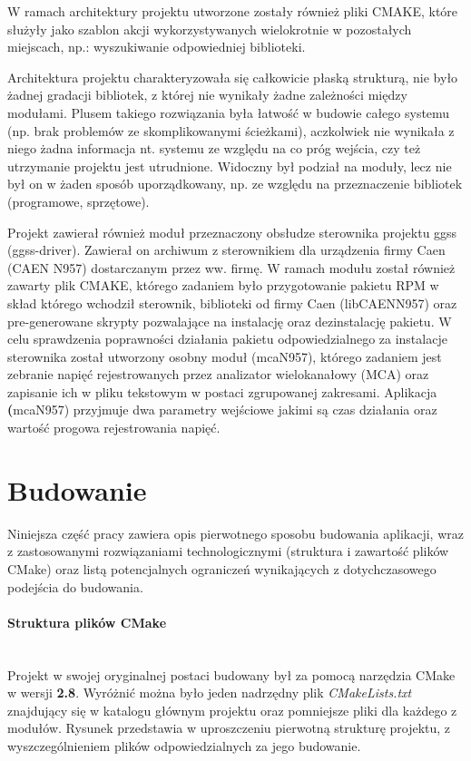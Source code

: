 W ramach architektury projektu utworzone zostały również pliki CMAKE, które służyły jako szablon akcji wykorzystywanych wielokrotnie w pozostałych miejscach, np.: wyszukiwanie odpowiedniej biblioteki.\par 
Architektura projektu charakteryzowała się całkowicie płaską strukturą, nie było żadnej gradacji bibliotek, z której nie wynikały żadne zależności między modułami. Plusem takiego rozwiązania była łatwość w budowie całego systemu (np. brak problemów ze skomplikowanymi ścieżkami), aczkolwiek nie wynikała z niego żadna informacja nt. systemu ze względu na co próg wejścia, czy też utrzymanie projektu jest utrudnione. Widoczny był podział na moduły, lecz nie był on w żaden sposób uporządkowany, np. ze względu na przeznaczenie bibliotek (programowe, sprzętowe). 

\par Projekt zawierał również moduł przeznaczony obsłudze sterownika projektu ggss (ggss-driver). Zawierał on archiwum z sterownikiem dla urządzenia firmy Caen (CAEN N957) dostarczanym przez ww. firmę. W ramach modułu został również zawarty plik CMAKE, którego zadaniem było przygotowanie pakietu RPM w skład którego wchodził sterownik, biblioteki od firmy Caen (libCAENN957) oraz pre-generowane skrypty pozwalające na instalację oraz dezinstalację pakietu. W celu sprawdzenia poprawności działania pakietu odpowiedzialnego za instalacje sterownika został utworzony osobny moduł (mcaN957), którego zadaniem jest zebranie napięć rejestrowanych przez analizator wielokanałowy (MCA) oraz zapisanie ich w pliku tekstowym w postaci zgrupowanej zakresami. Aplikacja \textbf(mcaN957) przyjmuje dwa parametry wejściowe jakimi są czas działania oraz wartość progowa rejestrowania napięć.

\section{Budowanie} 
Niniejsza część pracy zawiera opis pierwotnego sposobu budowania aplikacji, wraz z zastosowanymi rozwiązaniami technologicznymi (struktura i zawartość plików CMake) oraz listą potencjalnych ograniczeń wynikających z dotychczasowego podejścia do budowania.

\paragraph*{Struktura plików CMake}\mbox{}\\
Projekt w swojej oryginalnej postaci budowany był za pomocą narzędzia CMake w wersji \textbf{2.8}. Wyróżnić można było jeden nadrzędny plik \textit{CMakeLists.txt} znajdujący się w katalogu głównym projektu oraz pomniejsze pliki dla każdego z modułów. Rysunek przedstawia w uproszczeniu pierwotną strukturę projektu, z wyszczególnieniem plików odpowiedzialnych za jego budowanie.

